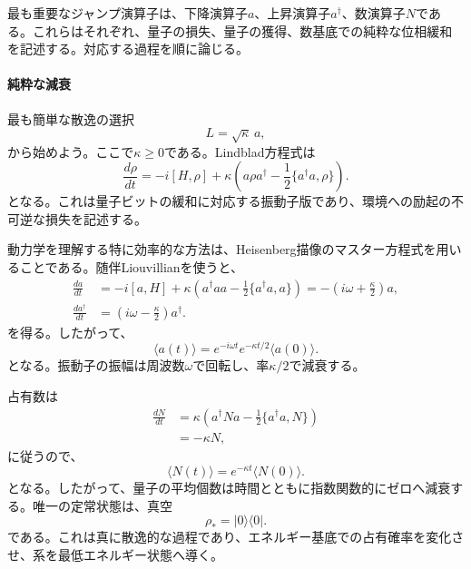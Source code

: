 \documentclass[a4paper,11pt,oneside]{article}
\theoremstyle{definition}
\numberwithin{equation}{section}
\begin{document}
最も重要なジャンプ演算子は、下降演算子$a$、上昇演算子$a^\dagger$、数演算子$N$である。これらはそれぞれ、量子の損失、量子の獲得、数基底での純粋な位相緩和を記述する。対応する過程を順に論じる。





\paragraph{純粋な減衰}



最も簡単な散逸の選択
\begin{equation}
L = \sqrt{\kappa}\,a ,
\end{equation}
から始めよう。ここで$\kappa\geq 0$である。Lindblad方程式は
\begin{equation}\label{oscdamp}
\frac{d\rho}{dt}
=
-i[H,\rho]
+
\kappa
\left(
a\rho a^\dagger
-\frac12\{a^\dagger a,\rho\}
\right) .
\end{equation}
となる。これは量子ビットの緩和に対応する振動子版であり、環境への励起の不可逆な損失を記述する。



動力学を理解する特に効率的な方法は、Heisenberg描像のマスター方程式を用いることである。随伴Liouvillianを使うと、
\begin{align}
\frac{da}{dt}
&=
-i[a,H]
+
\kappa
\left(
a^\dagger a a
-\frac12\{a^\dagger a,a\}
\right)
=
-\left(i\omega+\frac{\kappa}{2}\right)a ,
\\
\frac{da^\dagger}{dt}
&=
\left(i\omega-\frac{\kappa}{2}\right)a^\dagger .
\end{align}
を得る。したがって、
\begin{equation}
\langle a(t)\rangle
=
e^{-i\omega t}e^{-\kappa t/2}\langle a(0)\rangle .
\end{equation}
となる。振動子の振幅は周波数$\omega$で回転し、率$\kappa/2$で減衰する。



占有数は
\begin{align}
\frac{dN}{dt}
&=
\kappa
\left(
a^\dagger N a - \frac12\{a^\dagger a,N\}
\right)
\nonumber\\
&=
-\kappa N ,
\end{align}
に従うので、
\begin{equation}
\langle N(t)\rangle = e^{-\kappa t}\langle N(0)\rangle .
\end{equation}
となる。したがって、量子の平均個数は時間とともに指数関数的にゼロへ減衰する。唯一の定常状態は、真空
\begin{equation}
\rho_\ast = |0\rangle\langle 0| .
\end{equation}
である。これは真に散逸的な過程であり、エネルギー基底での占有確率を変化させ、系を最低エネルギー状態へ導く。
\end{document}
